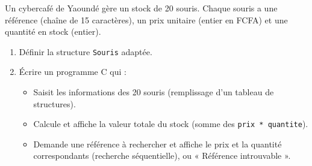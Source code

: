 \documentclass[11pt]{article}
\begin{document}
\begin{exercice}
Un cybercafé de Yaoundé gère un stock de 20 souris. Chaque souris a une référence (chaîne de 15 caractères), un prix unitaire (entier en FCFA) et une quantité en stock (entier).
\begin{enumerate}
\item Définir la structure \texttt{Souris} adaptée.
\item Écrire un programme C qui :
\begin{itemize}
\item Saisit les informations des 20 souris (remplissage d'un tableau de structures).
\item Calcule et affiche la valeur totale du stock (somme des \texttt{prix * quantite}).
\item Demande une référence à rechercher et affiche le prix et la quantité correspondants (recherche séquentielle), ou « Référence introuvable ».
\end{itemize}
\end{enumerate}
\end{exercice}
\end{document}

